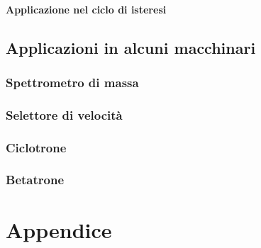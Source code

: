 \documentclass[x11names]{report}
\begin{document}
\subsubsection{Applicazione nel ciclo di isteresi}

\section{Applicazioni in alcuni macchinari}
\subsection{Spettrometro di massa}
\subsection{Selettore di velocità}
\subsection{Ciclotrone}
\subsection{Betatrone}


\chapter{Appendice}
\end{document}
